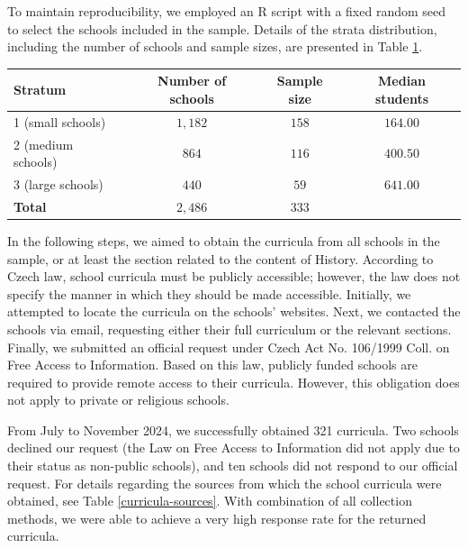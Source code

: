\documentclass[]{interact}
\theoremstyle{plain}%
\theoremstyle{definition}
\theoremstyle{remark}
\begin{document}
To maintain reproducibility, we employed an R script with a fixed random seed to select the schools included in the sample. Details of the strata distribution, including the number of schools and sample sizes, are presented in Table \ref{strata-distribution}.

\begin{table}
{\begin{tabular}{lccc} \toprule
Stratum & Number of schools & Sample size & Median students \\ \midrule
1 (small schools) & $1,182$ & $158$ & $164.00$ \\
2 (medium schools) & $864$ & $116$ & $400.50$ \\
3 (large schools) & $440$ & $59$ & $641.00$ \\ \midrule
\textbf{Total} & \textbf{$2,486$} & \textbf{$333$} & \\ \bottomrule
\end{tabular}}
\label{strata-distribution}
\end{table}

In the following steps, we aimed to obtain the curricula from all schools in the sample, or at least the section related to the content of History. According to Czech law, school curricula must be publicly accessible; however, the law does not specify the manner in which they should be made accessible. Initially, we attempted to locate the curricula on the schools’ websites. Next, we contacted the schools via email, requesting either their full curriculum or the relevant sections. Finally, we submitted an official request under Czech Act No. 106/1999 Coll. on Free Access to Information. Based on this law, publicly funded schools are required to provide remote access to their curricula. However, this obligation does not apply to private or religious schools.

From July to November 2024, we successfully obtained 321 curricula. Two schools declined our request (the Law on Free Access to Information did not apply due to their status as non-public schools), and ten schools did not respond to our official request. For details regarding the sources from which the school curricula were obtained, see Table \ref{curricula-sources}. With combination of all collection methods, we were able to achieve a very high response rate for the returned curricula.
\end{document}
